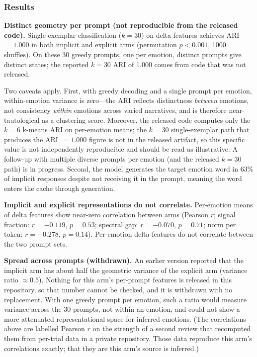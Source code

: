 \subsubsection{Results}

\textbf{Distinct geometry per prompt (not reproducible from the released code).} Single-exemplar
classification ($k=30$) on delta features achieves ARI $= 1.000$ in both
implicit and explicit arms (permutation $p < 0.001$, 1000 shuffles).
On these 30 greedy prompts, one per emotion, distinct prompts give
distinct states; the reported $k=30$ ARI of 1.000 comes from code that
was not released.

Two caveats apply. First, with greedy decoding and a single prompt per
emotion, within-emotion variance is zero---the ARI reflects
distinctness \emph{between} emotions, not consistency \emph{within}
emotions across varied narratives, and is therefore near-tautological
as a clustering score. Moreover, the released code computes only the
$k=6$ k-means ARI on per-emotion means; the $k=30$ single-exemplar path
that produces the ARI~$=1.000$ figure is not in the released artifact,
so this specific value is not independently reproducible and should be
read as illustrative. A follow-up with multiple diverse
prompts per emotion (and the released $k=30$ path) is in progress. Second, the model generates the
target emotion word in 63\% of implicit responses despite not receiving
it in the prompt, meaning the word enters the cache through generation.

\textbf{Implicit and explicit representations do not correlate.}
Per-emotion means of delta features show near-zero correlation between
arms (Pearson $r$; signal fraction: $r = -0.119$, $p = 0.53$; spectral gap:
$r = -0.070$, $p = 0.71$; norm per token: $r = -0.278$,
$p = 0.14$). Per-emotion delta features do not correlate between the
two prompt sets.

\textbf{Spread across prompts (withdrawn).} An earlier version reported that the implicit arm has about half the geometric variance of the explicit arm (variance ratio $\approx 0.5$). Nothing for this arm's per-prompt features is released in this repository, so that number cannot be checked, and it is withdrawn with no replacement. With one greedy prompt per emotion, such a ratio would measure variance across the 30 prompts, not within an emotion, and could not show a more attenuated representational space for inferred emotions. (The correlations above are labelled Pearson $r$ on the strength of a second review that recomputed them from per-trial data in a private repository. Those data reproduce this arm's correlations exactly; that they are this arm's source is inferred.)

